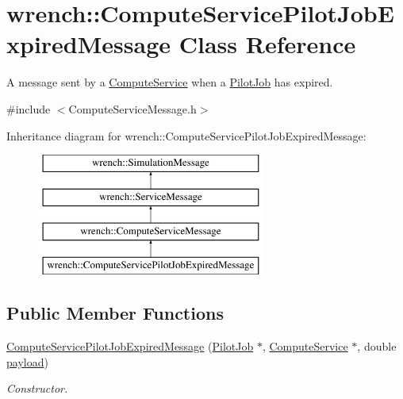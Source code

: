 \hypertarget{classwrench_1_1_compute_service_pilot_job_expired_message}{}\section{wrench\+:\+:Compute\+Service\+Pilot\+Job\+Expired\+Message Class Reference}
\label{classwrench_1_1_compute_service_pilot_job_expired_message}


A message sent by a \hyperlink{classwrench_1_1_compute_service}{Compute\+Service} when a \hyperlink{classwrench_1_1_pilot_job}{Pilot\+Job} has expired.  




{\ttfamily \#include $<$Compute\+Service\+Message.\+h$>$}

Inheritance diagram for wrench\+:\+:Compute\+Service\+Pilot\+Job\+Expired\+Message\+:\begin{figure}[H]
\begin{center}
\leavevmode
\includegraphics[height=4.000000cm]{classwrench_1_1_compute_service_pilot_job_expired_message}
\end{center}
\end{figure}
\subsection*{Public Member Functions}
\begin{DoxyCompactItemize}
\item 
\hyperlink{classwrench_1_1_compute_service_pilot_job_expired_message_afb2106c55a057f9011ed6da588da15d7}{Compute\+Service\+Pilot\+Job\+Expired\+Message} (\hyperlink{classwrench_1_1_pilot_job}{Pilot\+Job} $\ast$, \hyperlink{classwrench_1_1_compute_service}{Compute\+Service} $\ast$, double \hyperlink{classwrench_1_1_simulation_message_a914f2732713f7c02898e66f05a7cb8a1}{payload})
\begin{DoxyCompactList}\small\item\em Constructor. \end{DoxyCompactList}\end{DoxyCompactItemize}
